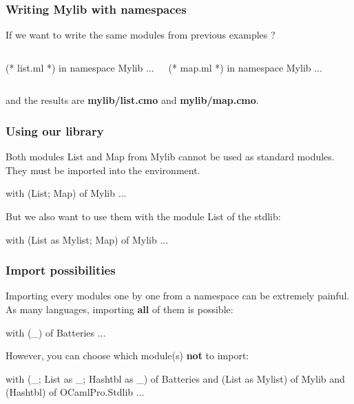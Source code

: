 \documentclass{beamer}
\begin{document}
\begin{frame}[fragile]
\frametitle{Writing Mylib with namespaces}

If we want to write the same modules from previous examples ?

\pause

\begin{columns}%
    \begin{OCaml}
      (* list.ml *)
      in namespace Mylib
      ...
    \end{OCaml}

    \begin{OCaml}
      (* map.ml *)
      in namespace Mylib
      ...
    \end{OCaml}
\end{columns}

and the results are \textbf{mylib/list.cmo} and \textbf{mylib/map.cmo}.
\end{frame}

\begin{frame}[fragile]
\frametitle{Using our library}

Both modules List and Map from Mylib cannot be used as standard modules. They
must be imported into the environment.

\pause

\begin{OCaml}
with (List; Map) of Mylib
...
\end{OCaml}

\pause

But we also want to use them with the module List of the stdlib:

\begin{OCaml}
with (List as Mylist; Map) of Mylib
...
\end{OCaml}

\end{frame}

\begin{frame}[fragile]
\frametitle{Import possibilities}

Importing every modules one by one from a namespace can be extremely painful. As
many languages, importing \textbf{all} of them is possible:

\begin{OCaml}
with (_) of Batteries
...
\end{OCaml}

\pause

However, you can choose which module(s) \textbf{not} to import:
\begin{OCaml}
with (_; List as _; Hashtbl as _) of Batteries
and (List as Mylist) of Mylib
and (Hashtbl) of OCamlPro.Stdlib
...
\end{OCaml}

\end{frame}
\end{document}
